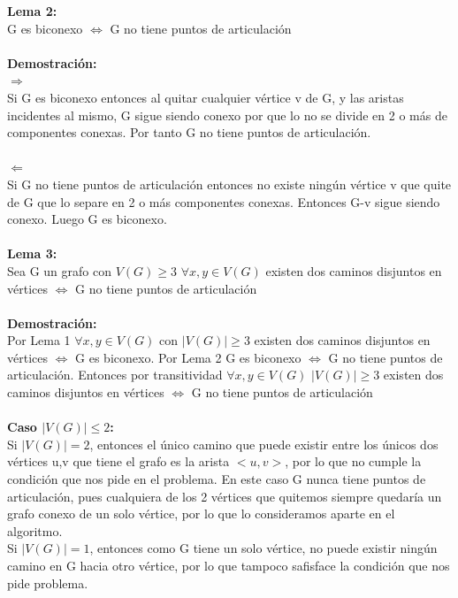 \documentclass{article}
\begin{document}
    \noindent \textbf{Lema 2:}\\
    G es biconexo $\Longleftrightarrow$ G no tiene puntos de articulaci\'on \\\\
    \noindent \textbf{Demostraci\'on:}\\
    $\Longrightarrow$\\
    Si G es biconexo entonces al quitar cualquier v\'ertice v de G, y las aristas incidentes al mismo,  
    G sigue siendo conexo por que lo no se divide en 2 o m\'as de componentes conexas. Por tanto G no
    tiene puntos de articulaci\'on.\\\\
    $\Longleftarrow$\\
    Si G no tiene puntos de articulaci\'on entonces no existe ning\'un  v\'ertice v que quite de G que lo separe en
    2 o m\'as componentes conexas. Entonces G-v sigue siendo conexo. Luego G es biconexo.\\\\
  
    
    \noindent \textbf{Lema 3:}\\
    Sea G un grafo con $V(G)\ge 3$ $\forall x,y\in V(G)$ existen dos caminos disjuntos en v\'ertices $\Longleftrightarrow$ G no tiene puntos de articulaci\'on\\\\
    \noindent \textbf{Demostraci\'on:}\\
    Por Lema 1  $\forall x,y\in V(G)$ con $|V(G)|\ge 3$ existen dos caminos disjuntos en v\'ertices $\Longleftrightarrow$ G es biconexo. 
    Por Lema 2 G es biconexo $\Longleftrightarrow$ G no tiene puntos de articulaci\'on.
    Entonces por transitividad $\forall x,y\in V(G)$ $|V(G)|\ge 3$ existen dos caminos disjuntos en v\'ertices 
    $\Longleftrightarrow$ G no tiene puntos de articulaci\'on\\\\
    
    \noindent \textbf{Caso  $|V(G)|\le 2$:}\\
    Si $|V(G)| = 2$, entonces el \'unico camino que puede existir entre los \'unicos dos v\'ertices u,v que tiene el grafo es la
    arista $<u,v>$, por lo que no cumple la condici\'on que nos pide en el problema. En este caso G nunca tiene puntos de articulaci\'on,
    pues cualquiera de los 2 v\'ertices que quitemos siempre quedar\'ia un grafo conexo de un solo v\'ertice, por lo que lo consideramos
    aparte en el algoritmo.\\
    Si $|V(G)| = 1$, entonces como G tiene un solo v\'ertice, no puede existir ning\'un camino en G hacia otro v\'ertice, por lo que tampoco safisface la condici\'on
    que nos pide problema.\\
\end{document}
